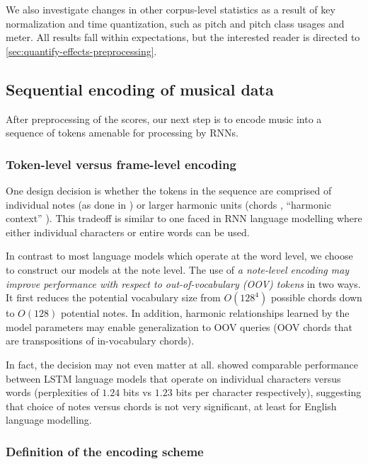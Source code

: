 We also investigate changes in other corpus-level statistics as a result of key
normalization and time quantization, such as pitch and pitch class usages and
meter. All results fall within expectations, but the interested reader is
directed to \vref{sec:quantify-effects-preprocessing}.

\subsection{Sequential encoding of musical data}
\label{sec:sequential-encoding}


After preprocessing of the scores, our next step is to encode music into a
sequence of tokens amenable for processing by RNNs.

\subsubsection{Token-level versus frame-level encoding}

One design decision is whether the tokens in the sequence are comprised of
individual notes (as done in
\citep{mozer1994neural,franklin2004recurrent,sturm2016music}) or larger
harmonic units (\eg chords \citep{Eck2002,Boulanger-Lewandowski2012},
``harmonic context'' \citep{Allan2005}). This tradeoff is similar to one faced
in RNN language modelling where either individual characters or entire words
can be used.

In contrast to most language models which operate at the word level, we choose
to construct our models at the note level. The use of \emph{a note-level encoding may
improve performance with respect to out-of-vocabulary (OOV) tokens} in two ways.
It first reduces the potential vocabulary size from $O(128^4)$ possible chords
down to $O(128)$ potential notes. In addition, harmonic relationships learned
by the model parameters may enable generalization to OOV queries (\eg OOV
chords that are transpositions of in-vocabulary chords).

In fact, the decision may not even matter at all. \citet{graves2013generating}
showed comparable performance between LSTM language models that operate on
individual characters versus words (perplexities of $1.24$ bits vs $1.23$ bits
per character respectively), suggesting that choice of notes versus chords is not
very significant, at least for English language modelling.

\subsubsection{Definition of the encoding scheme}

